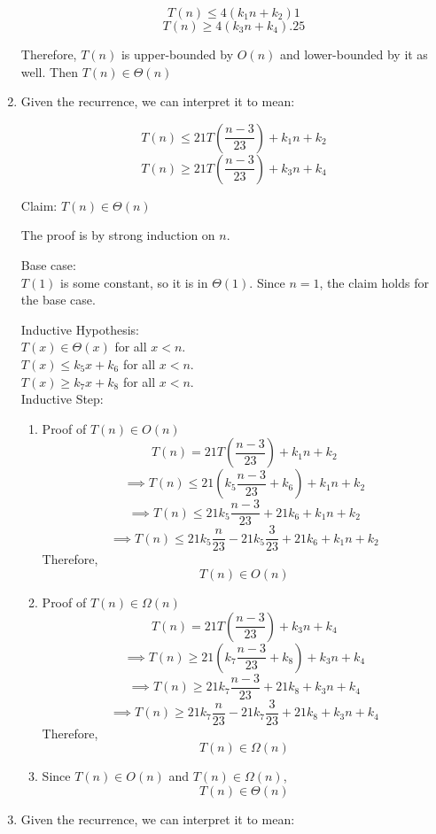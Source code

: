 \documentclass[11pt,letterpaper]{article}
\begin{document}
\begin{enumerate}
$$ T(n) \leq 4(k_1n + k_2) 1 $$
$$ T(n) \geq 4(k_3n + k_4) .25 $$

Therefore, $T(n)$ is upper-bounded by $O(n)$ and lower-bounded by it as well.
Then $T(n) \in \Theta(n)$

\item
Given the recurrence, we can interpret it to mean:

$$ T(n) \leq 21 T(\frac{n-3}{23}) + k_1n + k_2 $$
$$ T(n) \geq 21 T(\frac{n-3}{23}) + k_3n + k_4 $$

Claim: $ T(n) \in \Theta(n) $

The proof is by strong induction on $n$.

Base case:\\
$ T(1) $ is some constant, so it is in $ \Theta(1) $.
Since $ n = 1 $, the claim holds for the base case.

Inductive Hypothesis:\\
$ T(x) \in \Theta(x) $ for all $ x < n $. \\
$ T(x) \leq k_5 x + k_6 $ for all $ x < n $. \\
$ T(x) \geq k_7 x + k_8 $ for all $ x < n $. \\

Inductive Step:\\
\begin{enumerate}
\item
  Proof of $ T(n) \in O(n) $
           $$ T(n) = 21 T(\frac{n-3}{23}) + k_1n + k_2 $$ 
  $$ \implies T(n) \leq 21 ( k_5 \frac{n-3}{23} + k_6 ) + k_1n + k_2 $$ 
  $$ \implies T(n) \leq 21 k_5 \frac{n-3}{23} + 21 k_6 + k_1n + k_2 $$ 
  $$ \implies T(n) \leq 21 k_5 \frac{n}{23} - 21 k_5 \frac{3}{23} + 21 k_6 + k_1n + k_2 $$ 
  Therefore, $$ T(n) \in O(n) $$

\item
  Proof of $ T(n) \in \Omega(n) $
           $$ T(n) = 21 T(\frac{n-3}{23}) + k_3n + k_4 $$ 
  $$ \implies T(n) \geq 21 ( k_7 \frac{n-3}{23} + k_8 ) + k_3n + k_4 $$ 
  $$ \implies T(n) \geq 21 k_7 \frac{n-3}{23} + 21 k_8 + k_3n + k_4 $$ 
  $$ \implies T(n) \geq 21 k_7 \frac{n}{23} - 21 k_7 \frac{3}{23} + 21 k_8 + k_3n + k_4 $$ 
  Therefore, $$ T(n) \in \Omega(n) $$

\item
  Since $ T(n) \in O(n) $ and $ T(n) \in \Omega(n) $,
  $$ T(n) \in \Theta(n) $$
\end{enumerate}

\item
Given the recurrence, we can interpret it to mean:


\end{enumerate}
\end{document}
